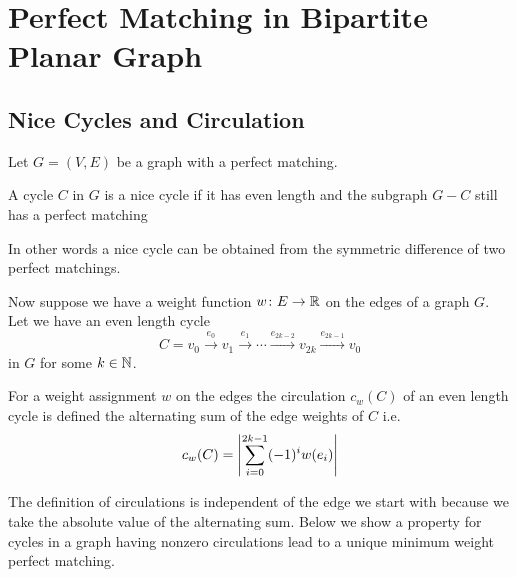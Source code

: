 \section{Perfect Matching in Bipartite Planar Graph}
\subsection{Nice Cycles and Circulation}
Let $G=(V,E)$ be a graph with a perfect matching. 
\begin{definition}\label{nice-cycle}
    A cycle $C$ in $G$ is a nice cycle if it has even length and the subgraph $G-C$ still has a perfect matching
\end{definition}\parinf
In other words a nice cycle can be obtained from the symmetric difference of two perfect matchings.\parinn

Now suppose we have a weight function $w\colon E\to \mathbb{R}$ on the edges of a graph $G$. Let we have an even length cycle $$C=v_0\overset{e_0}{\longrightarrow}v_1\overset{e_1}{\longrightarrow}\cdots \overset{e_{2k-2}}{\longrightarrow}v_{2k}\overset{e_{2k-1}}{\longrightarrow}v_0$$ in $G$ for some $k\in \mathbb{N}$.
\begin{definition}
    For a weight assignment $w$ on the edges the circulation $c_w(C)$ of an even length cycle is defined the alternating sum of the edge weights of $C$ i.e. $$c_w(C)=\left| \sum_{i=0}^{2k-1} (-1)^i w(e_{i}) \right|$$
\end{definition}

The definition of circulations is independent of the edge we start with because we take the absolute value of the alternating sum. Below we show a property for cycles in a graph having nonzero circulations lead to a unique minimum weight perfect matching.